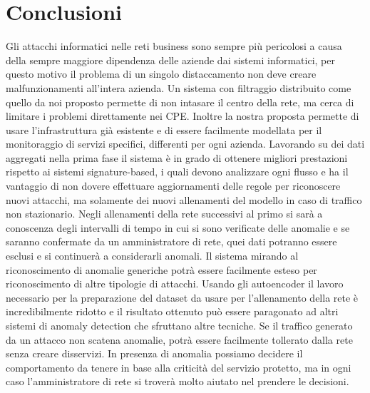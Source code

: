 \chapter{Conclusioni}

Gli attacchi informatici nelle reti business sono sempre più pericolosi a causa della sempre maggiore dipendenza delle aziende dai sistemi informatici, per questo motivo il problema di un singolo distaccamento non deve creare malfunzionamenti all'intera azienda.
Un sistema con filtraggio distribuito come quello da noi proposto permette di non intasare il centro della rete, ma cerca di limitare i problemi direttamente nei CPE.
Inoltre la nostra proposta permette di usare l'infrastruttura già esistente e di essere facilmente modellata per il monitoraggio di servizi specifici, differenti per ogni azienda.
Lavorando su dei dati aggregati nella prima fase il sistema è in grado di ottenere migliori prestazioni rispetto ai sistemi signature-based, i quali devono analizzare ogni flusso e ha il vantaggio di non dovere effettuare aggiornamenti delle regole per riconoscere nuovi attacchi, ma solamente dei nuovi allenamenti del modello in caso di traffico non stazionario. Negli allenamenti della rete successivi al primo si sarà a conoscenza degli intervalli di tempo in cui si sono verificate delle anomalie e se saranno confermate da un amministratore di rete, quei dati potranno essere esclusi e si continuerà a considerarli anomali.
Il sistema mirando al riconoscimento di anomalie generiche potrà essere facilmente esteso per riconoscimento di altre tipologie di attacchi.
Usando gli autoencoder il lavoro necessario per la preparazione del dataset da usare per l'allenamento della rete è incredibilmente ridotto e il risultato ottenuto può essere paragonato ad altri sistemi di anomaly detection che sfruttano altre tecniche.
Se il traffico generato da un attacco non scatena anomalie, potrà essere facilmente tollerato dalla rete senza creare disservizi.
In presenza di anomalia possiamo decidere il comportamento da tenere in base alla criticità del servizio protetto, ma in ogni caso l'amministratore di rete si troverà molto aiutato nel prendere le decisioni.
